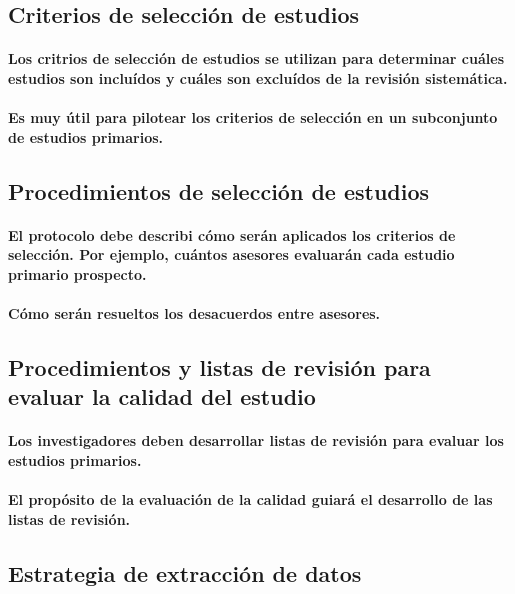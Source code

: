 \documentclass[10pt, twocolumn]{article}
\begin{document}
\subsection{Criterios de selección de estudios}
\paragraph{Los critrios de selección de estudios se utilizan para determinar cuáles estudios son incluídos y cuáles son excluídos de la revisión sistemática.}
\paragraph{Es muy útil para pilotear los criterios de selección en un subconjunto de estudios primarios.}

\subsection{Procedimientos de selección de estudios}
\paragraph{El protocolo debe describi cómo serán aplicados los criterios de selección. Por ejemplo, cuántos asesores evaluarán cada estudio primario prospecto.}
\paragraph{Cómo serán resueltos los desacuerdos entre asesores.}

\subsection{Procedimientos y listas de revisión para evaluar la calidad del estudio}
\paragraph{Los investigadores deben desarrollar listas de revisión para evaluar los estudios primarios.}
\paragraph{El propósito de la evaluación de la calidad guiará el desarrollo de las listas de revisión.}

\subsection{Estrategia de extracción de datos}
\end{document}
